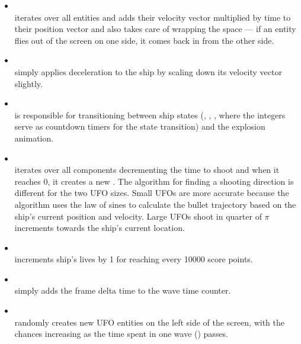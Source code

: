 \documentclass[
  digital, %
  color,   %
  table,   %
  oneside, %
  lof,     %
  lot,     %
]{fithesis3}
\begin{document}
\begin{itemize}[\textendash]
    \item  {}\\
    iterates over all entities and adds their velocity vector multiplied
    by time  to their position vector and also takes care
    of wrapping the space — if an entity flies out of the screen on one side,
    it comes back in from the other side.

    \item {}\\
    simply applies deceleration to the ship by scaling down its velocity vector slightly.

    \item {}\\
    is responsible for transitioning between ship states
    (, , ,
    where the integers serve as countdown timers for the state transition)
    and the explosion animation.

    \item {}\\
    iterates over all  components decrementing the time to
    shoot and when it reaches 0, it creates a new .
    The algorithm for finding a shooting direction is different for the two UFO sizes.
    Small UFOs are more accurate because the algorithm uses
    the law of sines to calculate the bullet trajectory based on the ship's current
    position and velocity. Large UFOs shoot in quarter of $\pi$ increments
    towards the ship's current location.

    \item {}\\
    increments ship's lives by 1 for reaching every 10000 score points.

    \item {}\\
    simply adds the frame delta time  to the wave time counter.

    \item {}\\
    randomly creates new UFO entities on the left side of the screen,
    with the chances increasing as the time spent in one wave () passes.


\end{itemize}
\end{document}
